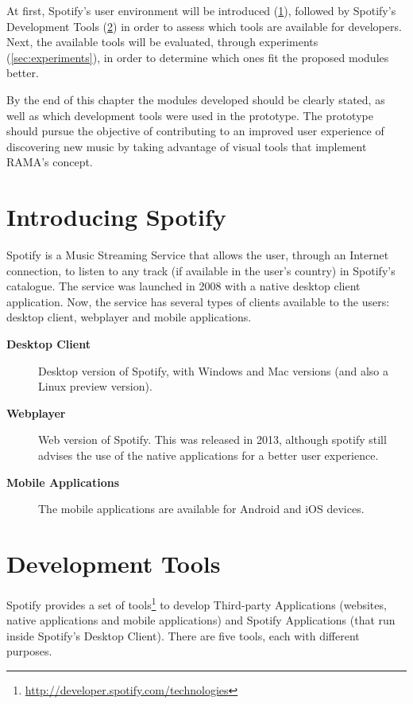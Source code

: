 At first, Spotify's user environment will be introduced (\ref{sec:spotify}), followed by Spotify's Development Tools (\ref{sec:devtools}) in order to assess which tools are available for developers.
Next, the available tools will be evaluated, through experiments (\ref{sec:experiments}), in order to determine which ones fit the proposed modules better.

By the end of this chapter the modules developed should be clearly stated, as well as which development tools were used in the prototype.
The prototype should pursue the objective of contributing to an improved user experience of discovering new music by taking advantage of visual tools that implement RAMA's concept.

\section{Introducing Spotify} %
\label{sec:spotify}

  Spotify is a Music Streaming Service that allows the user, through an Internet connection, to listen to any track (if available in the user's country) in Spotify's catalogue.
  The service was launched in 2008 with a native desktop client application.
  Now, the service has several types of clients available to the users: desktop client, webplayer and mobile applications.

  \begin{description}
    \item[\textbf{Desktop Client}] Desktop version of Spotify, with Windows and Mac versions (and also a Linux preview version).
    \item[\textbf{Webplayer}] Web version of Spotify. This was released in 2013, although spotify still advises the use of the native applications for a better user experience.
    \item[\textbf{Mobile Applications}] The mobile applications are available for Android and iOS devices.
  \end{description}

  \section{Development Tools} %
  \label{sec:devtools}
  
    Spotify provides a set of tools\footnote{\url{http://developer.spotify.com/technologies}} to develop Third-party Applications (websites, native applications and mobile applications) and Spotify Applications (that run inside Spotify's Desktop Client).
    There are five tools, each with different purposes.

